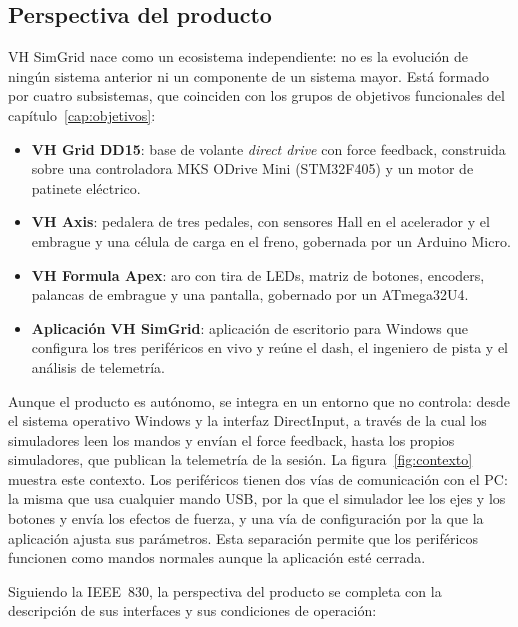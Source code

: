 \subsection{Perspectiva del producto}
\label{subsec:perspectiva}
VH SimGrid nace como un ecosistema independiente: no es la evolución de ningún sistema anterior ni un componente de un sistema mayor. Está formado por cuatro subsistemas, que coinciden con los grupos de objetivos funcionales del capítulo~\ref{cap:objetivos}:

\begin{itemize}
	\item \textbf{VH Grid DD15}: base de volante \emph{direct drive} con force feedback, construida sobre una controladora MKS ODrive Mini (STM32F405) y un motor de patinete eléctrico.
	\item \textbf{VH Axis}: pedalera de tres pedales, con sensores Hall en el acelerador y el embrague y una célula de carga en el freno, gobernada por un Arduino Micro.
	\item \textbf{VH Formula Apex}: aro con tira de LEDs, matriz de botones, encoders, palancas de embrague y una pantalla, gobernado por un ATmega32U4.
	\item \textbf{Aplicación VH SimGrid}: aplicación de escritorio para Windows que configura los tres periféricos en vivo y reúne el dash, el ingeniero de pista y el análisis de telemetría.
\end{itemize}

Aunque el producto es autónomo, se integra en un entorno que no controla: desde el sistema operativo Windows y la interfaz DirectInput, a través de la cual los simuladores leen los mandos y envían el force feedback, hasta los propios simuladores, que publican la telemetría de la sesión. La figura~\ref{fig:contexto} muestra este contexto. Los periféricos tienen dos vías de comunicación con el PC: la misma que usa cualquier mando USB, por la que el simulador lee los ejes y los botones y envía los efectos de fuerza, y una vía de configuración por la que la aplicación ajusta sus parámetros. Esta separación permite que los periféricos funcionen como mandos normales aunque la aplicación esté cerrada.
 

 
 Siguiendo la IEEE~830, la perspectiva del producto se completa con la descripción de sus interfaces y sus condiciones de operación:
 
